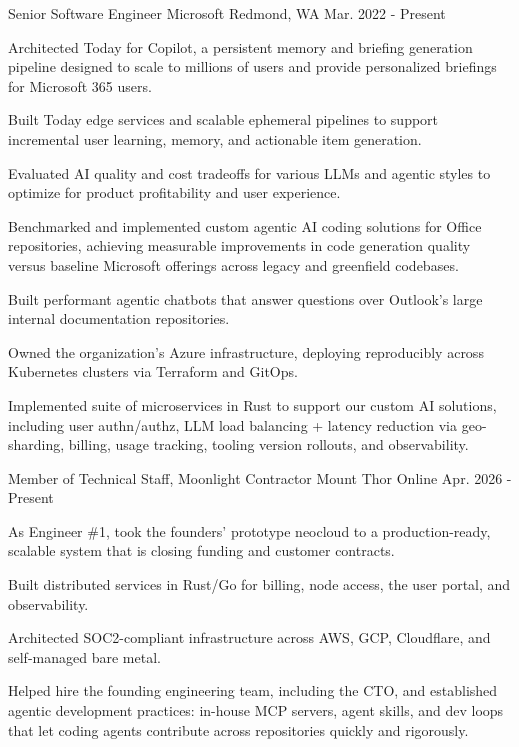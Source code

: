 \begin{cventries}
  \cventry
    {Senior Software Engineer}
    {Microsoft}
    {Redmond, WA}
    {Mar. 2022 - Present}
    {
      \begin{cvitems}
        \item{Architected Today for Copilot, a persistent memory and briefing generation pipeline designed to scale to millions of users and provide personalized briefings for Microsoft 365 users.}
        \item{Built Today edge services and scalable ephemeral pipelines to support incremental user learning, memory, and actionable item generation.}
        \item{Evaluated AI quality and cost tradeoffs for various LLMs and agentic styles to optimize for product profitability and user experience.}
        \item{Benchmarked and implemented custom agentic AI coding solutions for Office repositories, achieving measurable improvements in code generation quality versus baseline Microsoft offerings across legacy and greenfield codebases.}
        \item{Built performant agentic chatbots that answer questions over Outlook's large internal documentation repositories.}
        \item{Owned the organization's Azure infrastructure, deploying reproducibly across Kubernetes clusters via Terraform and GitOps.}
        \item{Implemented suite of microservices in Rust to support our custom AI solutions, including user authn/authz, LLM load balancing + latency reduction via geo-sharding, billing, usage tracking, tooling version rollouts, and observability.}
      \end{cvitems}
    }
  \cventry
    {Member of Technical Staff, Moonlight Contractor}
    {Mount Thor}
    {Online}
    {Apr. 2026 - Present}
    {
      \begin{cvitems}
        \item{As Engineer \#1, took the founders' prototype neocloud to a production-ready, scalable system that is closing funding and customer contracts.}
        \item{Built distributed services in Rust/Go for billing, node access, the user portal, and observability.}
        \item{Architected SOC2-compliant infrastructure across AWS, GCP, Cloudflare, and self-managed bare metal.}
        \item{Helped hire the founding engineering team, including the CTO, and established agentic development practices: in-house MCP servers, agent skills, and dev loops that let coding agents contribute across repositories quickly and rigorously.}

\end{cvitems}}
\end{cventries}
